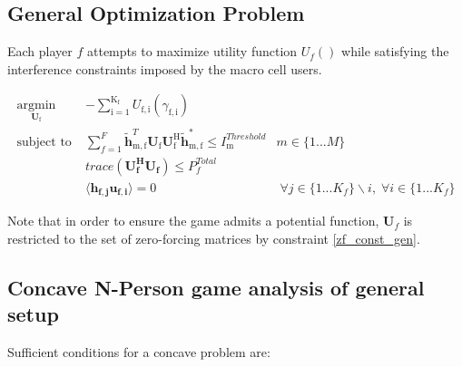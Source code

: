 \documentclass[12pt,a4paper]{report}
\begin{document}
\subsection{General Optimization Problem}

Each player $f$ attempts to maximize utility function $U_f()$ while satisfying the interference constraints imposed by the macro cell users.
\par




	\begin{subequations}
	\label{optim}
	\begin{align}
	    \underset{\mathbf{U}_{\mathrm{f}} }{\text{argmin}} \;
	    & - \sum_{\mathrm{i=1}}^{\mathrm{K_f}}
    	U_{\mathrm{f,i}}(\gamma_{\mathrm{f,i}}) \label{player_opt} \\
	    \text{subject to} \; &
	   \sum^F_{f=1} \mathbf{\tilde{h}}_{\mathrm{m,f}}^T  \mathbf{U_{\mathrm{f}}}		
	\mathbf{U_{\mathrm{f}}^{\mathrm{H}}} \mathbf{\tilde{h}_{\mathrm{m,f}}^*} \leq I^{Threshold}		
	_{\mathrm{m}} & m \in \{1 ...M\} 
		\label{interference_const_gen}\\
        & trace(\mathbf{U_f^H}\mathbf{U_f}) \leq P^{Total}_{f} \label{power_const_gen}\\
        & \langle \mathbf{h_{f,j}}\mathbf{u_{f,i}} \rangle =0\ & \; \forall j \in \{1... K_f\}\backslash i ,\; \forall i \in \{1 ... K_f\} \label{zf_const_gen}
	\end{align}
	\end{subequations}
	
Note that in order to ensure the game admits a potential function, $\mathbf{U}_f$ is restricted to the set of zero-forcing matrices by constraint \eqref{zf_const_gen}.	
	
\subsection{Concave N-Person game analysis of general setup}

Sufficient conditions for a concave problem are:
\end{document}
